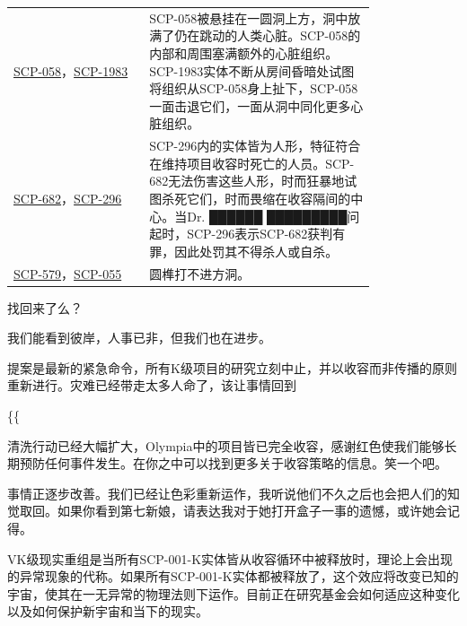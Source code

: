 \begin{longtable}{m{0.3\linewidth}m{0.5\linewidth}}
\hyperref[chap:SCP-058]{SCP-058}，\hyperref[chap:SCP-1983]{SCP-1983} & SCP-058被悬挂在一圆洞上方，洞中放满了仍在跳动的人类心脏。SCP-058的内部和周围塞满额外的心脏组织。SCP-1983实体不断从房间昏暗处试图将组织从SCP-058身上扯下，SCP-058一面击退它们，一面从洞中同化更多心脏组织。\\
\hyperref[chap:SCP-682]{SCP-682}，\hyperref[chap:SCP-296]{SCP-296} & SCP-296内的实体皆为人形，特征符合在维持项目收容时死亡的人员。SCP-682无法伤害这些人形，时而狂暴地试图杀死它们，时而畏缩在收容隔间的中心。当Dr. ██████ █████████问起时，SCP-296表示SCP-682获判有罪，因此处罚其不得杀人或自杀。\\
\hyperref[chap:SCP-579]{SCP-579}，\hyperref[chap:SCP-055]{SCP-055} & 圆榫打不进方洞。
\end{longtable}




\begin{scpbox}

找回来了么？

我们能看到彼岸，人事已非，但我们也在进步。

提案是最新的紧急命令，所有K级项目的研究立刻中止，并以收容而非传播的原则重新进行。灾难已经带走太多人命了，该让事情回到

\{\{

清洗行动已经大幅扩大，Olympia中的项目皆已完全收容，感谢红色使我们能够长期预防任何事件发生。在你之中可以找到更多关于收容策略的信息。笑一个吧。

事情正逐步改善。我们已经让色彩重新运作，我听说他们不久之后也会把人们的知觉取回。如果你看到第七新娘，请表达我对于她打开盒子一事的遗憾，或许她会记得。

\end{scpbox}

VK级现实重组是当所有SCP-001-K实体皆从收容循环中被释放时，理论上会出现的异常现象的代称。如果所有SCP-001-K实体都被释放了，这个效应将改变已知的宇宙，使其在一无异常的物理法则下运作。目前正在研究基金会如何适应这种变化以及如何保护新宇宙和当下的现实。
